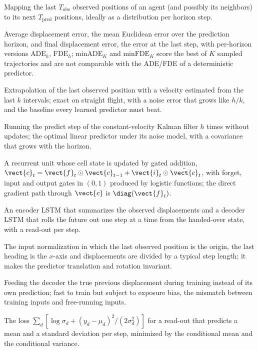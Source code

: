 \item[Trajectory prediction] Mapping the last $T_{\mathrm{obs}}$ observed positions of an agent (and possibly its neighbors) to its next $T_{\mathrm{pred}}$ positions, ideally as a distribution per horizon step.
\item[ADE / FDE / minADE$_K$] Average displacement error, the mean Euclidean error over the prediction horizon, and final displacement error, the error at the last step, with per-horizon versions $\mathrm{ADE}_h$, $\mathrm{FDE}_h$; $\mathrm{minADE}_K$ and $\mathrm{minFDE}_K$ score the best of $K$ sampled trajectories and are not comparable with the ADE/FDE of a deterministic predictor.
\item[Constant-velocity baseline] Extrapolation of the last observed position with a velocity estimated from the last $k$ intervals; exact on straight flight, with a noise error that grows like $h/k$, and the baseline every learned predictor must beat.
\item[Kalman extrapolation] Running the predict step of the constant-velocity Kalman filter $h$ times without updates; the optimal linear predictor under its noise model, with a covariance that grows with the horizon.
\item[LSTM cell] A recurrent unit whose cell state is updated by gated addition, $\vect{c}_t=\vect{f}_t\odot\vect{c}_{t-1}+\vect{i}_t\odot\tilde{\vect{c}}_t$, with forget, input and output gates in $(0,1)$ produced by logistic functions; the direct gradient path through $\vect{c}$ is $\diag(\vect{f}_t)$.
\item[Sequence-to-sequence predictor] An encoder LSTM that summarizes the observed displacements and a decoder LSTM that rolls the future out one step at a time from the handed-over state, with a read-out per step.
\item[Agent-centered frame] The input normalization in which the last observed position is the origin, the last heading is the $x$-axis and displacements are divided by a typical step length; it makes the predictor translation and rotation invariant.
\item[Teacher forcing] Feeding the decoder the true previous displacement during training instead of its own prediction; fast to train but subject to exposure bias, the mismatch between training inputs and free-running inputs.
\item[Gaussian negative log-likelihood] The loss $\sum_d[\log\sigma_d+(y_d-\mu_d)^2/(2\sigma_d^2)]$ for a read-out that predicts a mean and a standard deviation per step, minimized by the conditional mean and the conditional variance.
